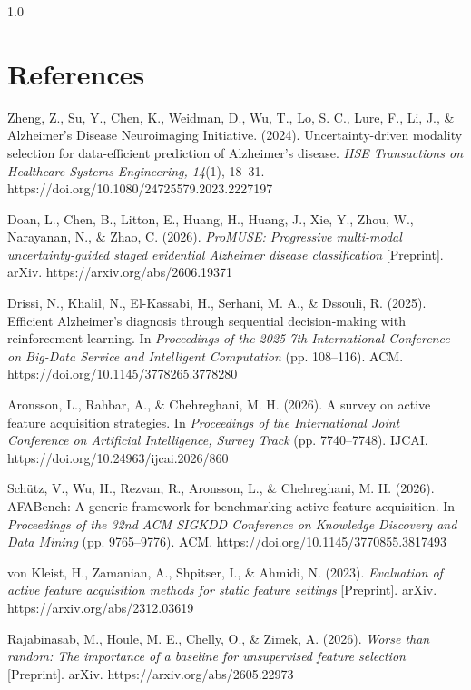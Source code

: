 \documentclass[12pt,twoside]{article}
\begin{document}
\begin{spacing}{1.0}
\section*{\fontsize{12}{12}\selectfont\textbf{References}}
\begingroup\footnotesize{}\raggedright
\begin{enumerate}[{[1]}]
\item Zheng, Z., Su, Y., Chen, K., Weidman, D., Wu, T., Lo, S. C., Lure, F., Li, J., \& Alzheimer's Disease Neuroimaging Initiative. (2024). Uncertainty-driven modality selection for data-efficient prediction of Alzheimer's disease. \textit{IISE Transactions on Healthcare Systems Engineering, 14}(1), 18--31. https://doi.org/10.1080/24725579.2023.2227197
\item Doan, L., Chen, B., Litton, E., Huang, H., Huang, J., Xie, Y., Zhou, W., Narayanan, N., \& Zhao, C. (2026). \textit{ProMUSE: Progressive multi-modal uncertainty-guided staged evidential Alzheimer disease classification} [Preprint]. arXiv. https://arxiv.org/abs/2606.19371
\item Drissi, N., Khalil, N., El-Kassabi, H., Serhani, M. A., \& Dssouli, R. (2025). Efficient Alzheimer's diagnosis through sequential decision-making with reinforcement learning. In \textit{Proceedings of the 2025 7th International Conference on Big-Data Service and Intelligent Computation} (pp. 108--116). ACM. https://doi.org/10.1145/3778265.3778280
\item Aronsson, L., Rahbar, A., \& Chehreghani, M. H. (2026). A survey on active feature acquisition strategies. In \textit{Proceedings of the International Joint Conference on Artificial Intelligence, Survey Track} (pp. 7740--7748). IJCAI. https://doi.org/10.24963/ijcai.2026/860
\item Sch\"{u}tz, V., Wu, H., Rezvan, R., Aronsson, L., \& Chehreghani, M. H. (2026). AFABench: A generic framework for benchmarking active feature acquisition. In \textit{Proceedings of the 32nd ACM SIGKDD Conference on Knowledge Discovery and Data Mining} (pp. 9765--9776). ACM. https://doi.org/10.1145/3770855.3817493
\item von Kleist, H., Zamanian, A., Shpitser, I., \& Ahmidi, N. (2023). \textit{Evaluation of active feature acquisition methods for static feature settings} [Preprint]. arXiv. https://arxiv.org/abs/2312.03619
\item Rajabinasab, M., Houle, M. E., Chelly, O., \& Zimek, A. (2026). \textit{Worse than random: The importance of a baseline for unsupervised feature selection} [Preprint]. arXiv. https://arxiv.org/abs/2605.22973

\end{enumerate}
\end{spacing}
\end{document}
